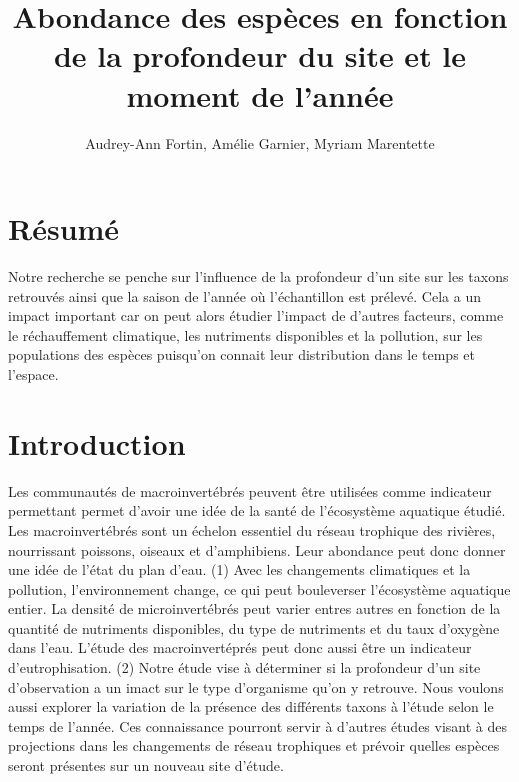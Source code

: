 \documentclass[9pt,twocolumn,twoside,]{pnas-new}
\title{Abondance des espèces en fonction de la profondeur du site et le
moment de l'année}
\author[a,1,2]{Audrey-Ann Fortin, Amélie Garnier, Myriam Marentette}
\affil[a]{Université de Sherbrooke}
\begin{document}
\verticaladjustment{-2pt}



\maketitle
\thispagestyle{firststyle}


\acknow{}

\hypertarget{ruxe9sumuxe9}{%
\section*{Résumé}\label{ruxe9sumuxe9}}

Notre recherche se penche sur l'influence de la profondeur d'un site sur
les taxons retrouvés ainsi que la saison de l'année où l'échantillon est
prélevé. Cela a un impact important car on peut alors étudier l'impact
de d'autres facteurs, comme le réchauffement climatique, les nutriments
disponibles et la pollution, sur les populations des espèces puisqu'on
connait leur distribution dans le temps et l'espace.

\hypertarget{introduction}{%
\section*{Introduction}\label{introduction}}

Les communautés de macroinvertébrés peuvent être utilisées comme
indicateur permettant permet d'avoir une idée de la santé de
l'écosystème aquatique étudié. Les macroinvertébrés sont un échelon
essentiel du réseau trophique des rivières, nourrissant poissons,
oiseaux et d'amphibiens. Leur abondance peut donc donner une idée de
l'état du plan d'eau. (1) Avec les changements climatiques et la
pollution, l'environnement change, ce qui peut bouleverser l'écosystème
aquatique entier. La densité de microinvertébrés peut varier entres
autres en fonction de la quantité de nutriments disponibles, du type de
nutriments et du taux d'oxygène dans l'eau. L'étude des macroinvertéprés
peut donc aussi être un indicateur d'eutrophisation. (2) Notre étude
vise à déterminer si la profondeur d'un site d'observation a un imact
sur le type d'organisme qu'on y retrouve. Nous voulons aussi explorer la
variation de la présence des différents taxons à l'étude selon le temps
de l'année. Ces connaissance pourront servir à d'autres études visant à
des projections dans les changements de réseau trophiques et prévoir
quelles espèces seront présentes sur un nouveau site d'étude.
\end{document}
